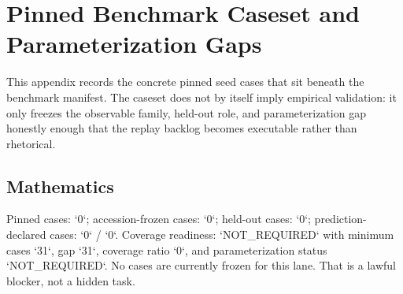\section{Pinned Benchmark Caseset and Parameterization Gaps}
\label{sec:oc-core-1-3-domain-benchmark-caseset}

This appendix records the concrete pinned seed cases that sit beneath the benchmark manifest. The caseset does not by itself imply empirical validation: it only freezes the observable family, held-out role, and parameterization gap honestly enough that the replay backlog becomes executable rather than rhetorical.

\subsection{Mathematics}
Pinned cases: `0`; accession-frozen cases: `0`; held-out cases: `0`; prediction-declared cases: `0` / `0`.
Coverage readiness: `NOT\_REQUIRED` with minimum cases `31`, gap `31`, coverage ratio `0`, and parameterization status `NOT\_REQUIRED`.
No cases are currently frozen for this lane. That is a lawful blocker, not a hidden task.

